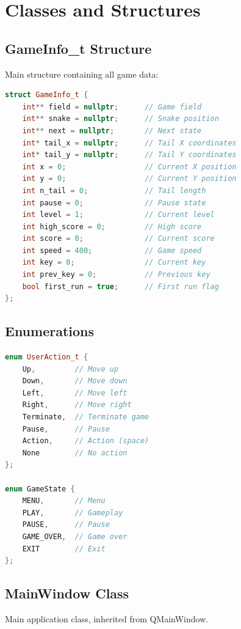 \documentclass[12pt,a4paper]{article}
\begin{document}
\section{Classes and Structures}

\subsection{GameInfo\_t Structure}
Main structure containing all game data:

\begin{lstlisting}[language=C++,caption=GameInfo\_t structure]
struct GameInfo_t {
    int** field = nullptr;      // Game field
    int** snake = nullptr;      // Snake position
    int** next = nullptr;       // Next state
    int* tail_x = nullptr;      // Tail X coordinates
    int* tail_y = nullptr;      // Tail Y coordinates
    int x = 0;                  // Current X position
    int y = 0;                  // Current Y position
    int n_tail = 0;             // Tail length
    int pause = 0;              // Pause state
    int level = 1;              // Current level
    int high_score = 0;         // High score
    int score = 0;              // Current score
    int speed = 400;            // Game speed
    int key = 0;                // Current key
    int prev_key = 0;           // Previous key
    bool first_run = true;      // First run flag
};
\end{lstlisting}

\subsection{Enumerations}
\begin{lstlisting}[language=C++,caption=User actions]
enum UserAction_t { 
    Up,         // Move up
    Down,       // Move down
    Left,       // Move left
    Right,      // Move right
    Terminate,  // Terminate game
    Pause,      // Pause
    Action,     // Action (space)
    None        // No action
};

enum GameState { 
    MENU,       // Menu
    PLAY,       // Gameplay
    PAUSE,      // Pause
    GAME_OVER,  // Game over
    EXIT        // Exit
};
\end{lstlisting}

\subsection{MainWindow Class}
Main application class, inherited from QMainWindow.
\end{document}

